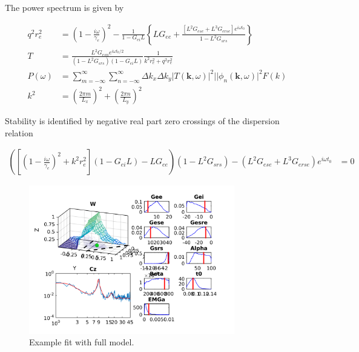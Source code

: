 \documentclass[10pt,a4paper]{article}
\begin{document}
The power spectrum is given by

\begin{align}
 q^2r_e^2 &= \left( 1-\frac{i\omega}{\gamma_e} \right)^2   - \frac{1}{1-G_{ei}L} \left\lbrace LG_{ee} + \frac{\left[ L^2G_{ese}  + L^3 G_{erse}\right]e^{i\omega t_0}}{1 - L^2 G_{srs}}  \right\rbrace \\
T &=  \frac{L^2G_{esn}e^{i\omega t_0 /2}}{(1 - L^2 G_{srs})(1-G_{ei}L)} \frac{1}{k^2r_e^2 + q^2r_e^2}\\
 P(\omega) &= \sum_{m = -\infty}^{\infty}\sum_{n = -\infty}^{\infty} \Delta k_x \Delta k_y |T(\mathbf{k},\omega)|^2||\phi_n(\mathbf{k},\omega)|^2F(k)\\
k^2 &=  \left( \frac{2\pi m}{L_x} \right)^2 + \left( \frac{2\pi n}{L_y}\right)^2 
\end{align}

Stability is identified by negative real part zero crossings of the dispersion relation

\begin{align}
\label{eqn:dispersion_relation}
\left( \left[ \left( 1-\frac{i\omega}{\gamma_e} \right)^2 + k^2r_e^2 \right](1-G_{ei}L) - LG_{ee} \right) (1 - L^2 G_{srs}) - (L^2G_{ese}  + L^3 G_{erse})e^{i\omega t_0} &= 0
\end{align}

\begin{figure}[h!]
\begin{center}
\includegraphics[width=0.8\textwidth]{example_full}
\caption{Example fit with full model.}
\label{fig:full}
\end{center}
\end{figure}
\end{document}
